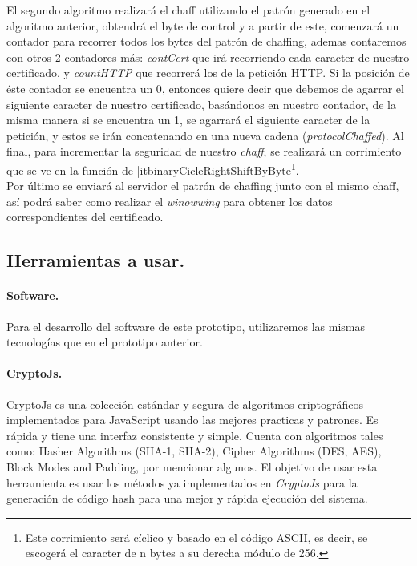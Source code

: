 \documentclass[12pt, a4paper, titlepage]{report}
\begin{document}
		    El segundo algoritmo realizará el chaff utilizando el patrón generado en el algoritmo anterior, obtendrá el byte de control y a partir de este, comenzará un contador para recorrer todos los bytes del patrón de chaffing, ademas contaremos con otros 2 contadores más: \textit{contCert} que irá recorriendo cada caracter de nuestro certificado, y \textit{countHTTP} que recorrerá los de la petición HTTP. Si la posición de éste contador se encuentra un 0, entonces quiere decir que debemos de agarrar el siguiente caracter de nuestro certificado, basándonos en nuestro contador, de la misma manera si se encuentra un 1, se agarrará el siguiente caracter de la petición, y estos se irán concatenando en una nueva cadena (\textit{protocolChaffed}). Al final, para incrementar la seguridad de nuestro \textit{chaff}, se realizará un corrimiento que se ve en la función de \text|it{binaryCicleRightShiftByByte}\footnote{Este corrimiento será cíclico y basado en el código ASCII, es decir, se escogerá el caracter de n bytes a su derecha módulo de 256.}.\\
		    
		    Por último se enviará al servidor el patrón de chaffing junto con el mismo chaff, así podrá saber como realizar el \textit{winowwing} para obtener los datos correspondientes del certificado.
		    
		    \subsection{Herramientas a usar.}
		        \paragraph{Software. \\}
				Para el desarrollo del software de este prototipo, utilizaremos las mismas tecnolog\'ias que en el prototipo anterior.
				
				\paragraph{CryptoJs. \\}
				CryptoJs es una colección estándar y segura de algoritmos criptográficos implementados para JavaScript usando las mejores practicas y patrones. Es rápida y tiene una interfaz consistente y simple. Cuenta con algoritmos tales como: Hasher Algorithms (SHA-1, SHA-2), Cipher Algorithms (DES, AES), Block Modes and Padding, por mencionar algunos. \cite{refCryptoJs} El objetivo de usar esta herramienta es usar los métodos ya implementados en \textit{CryptoJs} para la generación de código hash para una mejor y rápida ejecución del sistema.
				
\end{document}
